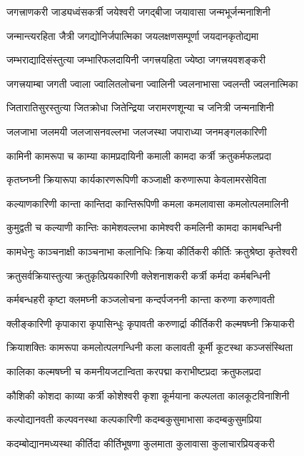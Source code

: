\twolineshloka
{जगत्त्राणकरी जाड्यध्वंसकर्त्री जयेश्वरी}
{जगद्बीजा जयावासा जन्मभूर्जन्मनाशिनी}%

\twolineshloka
{जन्मान्त्यरहिता जैत्री जगद्योनिर्जपात्मिका}
{जयलक्षणसम्पूर्णा जयदानकृतोद्यमा}%

\twolineshloka
{जम्भराद्यादिसंस्तुत्या जम्भारिफलदायिनी}
{जगत्त्रयहिता ज्येष्ठा जगत्त्रयवशङ्करी}%

\twolineshloka
{जगत्त्रयाम्बा जगती ज्वाला ज्वालितलोचना}
{ज्वालिनी ज्वलनाभासा ज्वलन्ती ज्वलनात्मिका}%

\twolineshloka
{जितारातिसुरस्तुत्या जितक्रोधा जितेन्द्रिया}
{जरामरणशून्या च जनित्री जन्मनाशिनी}%

\twolineshloka
{जलजाभा जलमयी जलजासनवल्लभा}
{जलजस्था जपाराध्या जनमङ्गलकारिणी}%

\twolineshloka
{कामिनी कामरूपा च काम्या कामप्रदायिनी}
{कमाली कामदा कर्त्री क्रतुकर्मफलप्रदा}%

\twolineshloka
{कृतघ्नघ्नी क्रियारूपा कार्यकारणरूपिणी}
{कञ्जाक्षी करुणारूपा केवलामरसेविता}%

\twolineshloka
{कल्याणकारिणी कान्ता कान्तिदा कान्तिरूपिणी}
{कमला कमलावासा कमलोत्पलमालिनी}%

\twolineshloka
{कुमुद्वती च कल्याणी कान्तिः कामेशवल्लभा}
{कामेश्वरी कमलिनी कामदा कामबन्धिनी}%

\twolineshloka
{कामधेनुः काञ्चनाक्षी काञ्चनाभा कलानिधिः}
{क्रिया कीर्तिकरी कीर्तिः क्रतुश्रेष्ठा कृतेश्वरी}%

\twolineshloka
{क्रतुसर्वक्रियास्तुत्या क्रतुकृत्प्रियकारिणी}
{क्लेशनाशकरी कर्त्री कर्मदा कर्मबन्धिनी}%

\twolineshloka
{कर्मबन्धहरी कृष्टा क्लमघ्नी कञ्जलोचना}
{कन्दर्पजननी कान्ता करुणा करुणावती}%

\twolineshloka
{क्लीङ्कारिणी कृपाकारा कृपासिन्धुः कृपावती}
{करुणार्द्रा कीर्तिकरी कल्मषघ्नी क्रियाकरी}%

\twolineshloka
{क्रियाशक्तिः कामरूपा कमलोत्पलगन्धिनी}
{कला कलावती कूर्मी कूटस्था कञ्जसंस्थिता}%

\twolineshloka
{कालिका कल्मषघ्नी च कमनीयजटान्विता}
{करपद्मा कराभीष्टप्रदा क्रतुफलप्रदा}%

\twolineshloka
{कौशिकी कोशदा काव्या कर्त्री कोशेश्वरी कृशा}
{कूर्मयाना कल्पलता कालकूटविनाशिनी}%

\twolineshloka
{कल्पोद्यानवती कल्पवनस्था कल्पकारिणी}
{कदम्बकुसुमाभासा कदम्बकुसुमप्रिया}%

\twolineshloka
{कदम्बोद्यानमध्यस्था कीर्तिदा कीर्तिभूषणा}
{कुलमाता कुलावासा कुलाचारप्रियङ्करी}%

